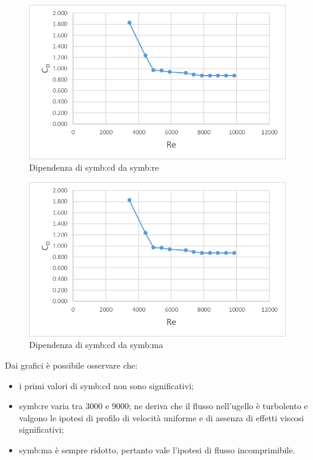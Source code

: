 \begin{figure}[H]
	\centering
	\includegraphics[width=0.7\linewidth]{chapters/5-laboratorio/dipendenzaRe2}
		\caption{Dipendenza di \gls{symb:cd} da \gls{symb:re}}
	\label{fig:dipendenzare}
\end{figure}

\begin{figure}[H]
	\centering
	\includegraphics[width=0.7\linewidth]{chapters/5-laboratorio/dipendenzaMa2}
	\caption{Dipendenza di \gls{symb:cd} da \gls{symb:ma}}
	\label{fig:dipendenzama}
\end{figure}




Dai grafici è possibile osservare che: 
\begin{itemize}
	\item i primi valori di \gls{symb:cd} non sono significativi;
	\item \gls{symb:re} varia tra 3000 e 9000; ne deriva che il flusso nell'ugello è turbolento e valgono le ipotesi di profilo di velocità uniforme e di assenza di effetti viscosi significativi;
	\item \gls{symb:ma} è sempre ridotto, pertanto vale l'ipotesi di flusso incomprimibile.
\end{itemize}
